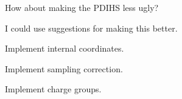 \begin{DoxyRefList}
\-How about making the \-P\-D\-I\-H\-S less ugly?  
\item[\label{todo__todo000013}%
\hypertarget{todo__todo000013}{}%
\-Member \hyperlink{namespaceforcebalance_1_1nifty_a8d63c8ae9a67c66673a6cf81357f827d}{forcebalance\-:\-:nifty.floatornan} ]\-I could use suggestions for making this better.  
\item[\label{todo__todo000017}%
\hypertarget{todo__todo000017}{}%
\-Member \hyperlink{namespaceforcebalance_1_1parser_ac184c809737a27f35530020322431f7c}{forcebalance\-:\-:parser.parse\-\_\-inputs} ]\-Implement internal coordinates. 

\-Implement sampling correction. 

\-Implement charge groups. 
\end{DoxyRefList}